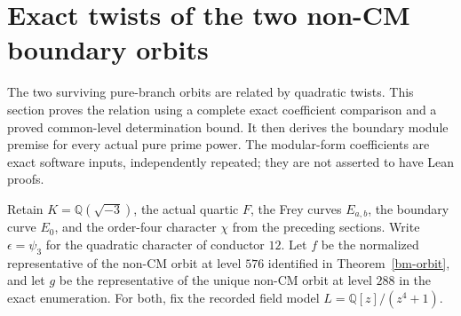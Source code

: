 \section{Exact twists of the two non-CM boundary orbits}
\label{bt-section}

The two surviving pure-branch orbits are related by quadratic twists.
This section proves the relation using a complete exact coefficient
comparison and a proved common-level determination bound. It then
derives the boundary module premise for every actual pure prime power.
The modular-form coefficients are exact software inputs, independently
repeated; they are not asserted to have Lean proofs.

Retain $K=\mathbb Q(\sqrt{-3})$, the actual quartic $F$, the Frey
curves $E_{a,b}$, the boundary curve $E_0$, and the order-four character
$\chi$ from the preceding sections. Write $\epsilon=\psi_3$ for the
quadratic character of conductor $12$. Let $f$ be the normalized
representative of the non-CM orbit at level $576$ identified in
Theorem~\ref{bm-orbit}, and let $g$ be the representative of the
unique non-CM orbit at level $288$ in the exact enumeration.
For both, fix the recorded field model $L=\mathbb Q[z]/(z^4+1)$.

